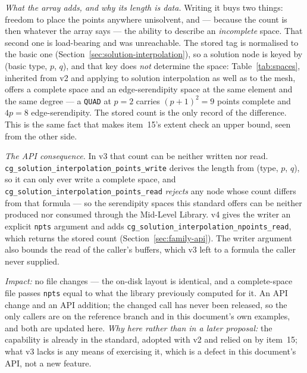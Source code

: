 \documentclass[11pt,letterpaper]{article}
\newif\ifvfourdraft
\newenvironment{v4block}{\ifvfourdraft\color{v4violet}\fi\ignorespaces}{\par}
\begin{document}
{\begin{v4block}
\begin{enumerate}[leftmargin=1.4em,itemsep=0.5em]
    \textit{What the array adds, and why its length is data.}  Writing it buys two
    things: freedom to place the points anywhere unisolvent, and --- because the
    count is then whatever the array says --- the ability to describe an
    \emph{incomplete} space.  That second one is load-bearing and was
    unreachable.  The stored tag is normalised to the basic one
    (Section~\ref{sec:solution-interpolation}), so a solution node is keyed by
    (basic type, $p$, $q$), and that key does \emph{not} determine the space:
    Table~\ref{tab:spaces}, inherited from v2 and applying to solution
    interpolation as well as to the mesh, offers a complete space and an
    edge-serendipity space at the same element and the same degree --- a
    \texttt{QUAD} at $p=2$ carries $(p+1)^2 = 9$ points complete and $4p = 8$
    edge-serendipity.  The stored count is the only record of the difference.
    This is the same fact that makes item~15's extent check an upper bound, seen
    from the other side.

    \textit{The API consequence.}  In v3 that count can be neither written nor
    read.  \texttt{cg\_solution\_interpolation\_points\_write} derives the length
    from (type, $p$, $q$), so it can only ever write a complete space, and
    \texttt{cg\_solution\_interpolation\_points\_read} \emph{rejects} any node
    whose count differs from that formula --- so the serendipity spaces this
    standard offers can be neither produced nor consumed through the Mid-Level
    Library.  v4 gives the writer an explicit \texttt{npts} argument and adds
    \texttt{cg\_solution\_interpolation\_npoints\_read}, which returns the stored
    count (Section~\ref{sec:family-api}).  The writer argument also bounds the
    read of the caller's buffers, which v3 left to a formula the caller never
    supplied.

    \textit{Impact:} no file changes --- the on-disk layout is identical, and a
    complete-space file passes \texttt{npts} equal to what the library previously
    computed for it.  An API change and an API addition; the changed call has
    never been released, so the only callers are on the reference branch and in
    this document's own examples, and both are updated here.
    \textit{Why here rather than in a later proposal:} the capability is already
    in the standard, adopted with v2 and relied on by item~15; what v3 lacks is
    any means of exercising it, which is a defect in this document's API, not a
    new feature.


\end{enumerate}
\end{v4block}}
\end{document}
